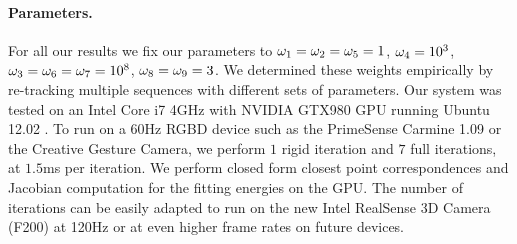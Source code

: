 \paragraph*{Parameters.} For all our results we fix our parameters to $\omega_1 = \omega_2 = \omega_5 = 1$, $\omega_4 = 10^3$, $\omega_3 = \omega_6 = \omega_7 = 10^8$, $\omega_8 = \omega_9 = 3$. We determined these weights empirically by re-tracking multiple sequences with different sets of parameters. 
Our system was tested on an Intel Core i7 4GHz with NVIDIA GTX980 GPU running Ubuntu 12.02 . To run on a 60Hz RGBD device such as the PrimeSense Carmine 1.09 or the Creative Gesture Camera, we perform $1$ rigid iteration and $7$ full iterations, at $1.5$ms per iteration. We perform closed form closest point correspondences and Jacobian computation for the fitting energies on the GPU. The number of iterations can be easily adapted to run on the new Intel RealSense 3D Camera (F200) at 120Hz or at even higher frame rates on future devices.




